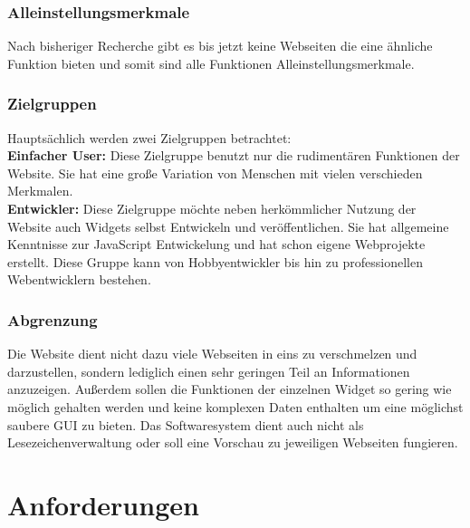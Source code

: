 		\subsubsection{Alleinstellungsmerkmale}  
			Nach bisheriger Recherche gibt es bis jetzt keine Webseiten die eine ähnliche Funktion bieten und somit sind alle Funktionen Alleinstellungsmerkmale.   
			
		\subsubsection{Zielgruppen}
			Hauptsächlich werden zwei Zielgruppen betrachtet: \\
			\textbf{Einfacher User: } Diese Zielgruppe benutzt nur die rudimentären Funktionen der Website. Sie hat eine große Variation von Menschen mit vielen verschieden Merkmalen.\\
			\textbf{Entwickler: }Diese Zielgruppe möchte neben herkömmlicher Nutzung der Website auch Widgets selbst Entwickeln und veröffentlichen. Sie hat allgemeine Kenntnisse zur JavaScript Entwickelung und hat schon eigene Webprojekte erstellt. Diese Gruppe kann von Hobbyentwickler bis hin zu professionellen Webentwicklern bestehen.   
			
		\subsubsection{Abgrenzung} 
			Die Website dient nicht dazu viele Webseiten in eins zu verschmelzen und darzustellen, sondern lediglich einen sehr geringen Teil an Informationen anzuzeigen. Außerdem sollen die Funktionen der einzelnen Widget so gering wie möglich gehalten werden und keine komplexen Daten enthalten um eine möglichst saubere GUI zu bieten. Das Softwaresystem dient auch nicht als Lesezeichenverwaltung oder soll eine Vorschau zu jeweiligen Webseiten fungieren.

\newpage				
\section{Anforderungen}

